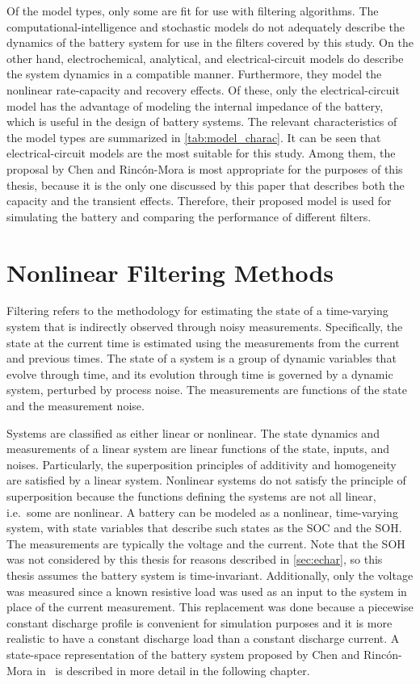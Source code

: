 \documentclass[../zhang_thesis.tex]{subfiles}
\begin{document}
Of the model types, only some are fit for use with filtering algorithms. The computational-intelligence and stochastic models do not adequately describe the dynamics of the battery system for use in the filters covered by this study. On the other hand, electrochemical, analytical, and electrical-circuit models do describe the system dynamics in a compatible manner. Furthermore, they model the nonlinear rate-capacity and recovery effects. Of these, only the electrical-circuit model has the
advantage of modeling the internal impedance of the battery, which is useful in the design of battery systems. The relevant characteristics of the model types are summarized in \cref{tab:model_charac}. It can be seen that electrical-circuit models are the most suitable for this study. Among them, the proposal by Chen and Rinc\'on-Mora is most appropriate for the purposes of this thesis, because it is the only one discussed by this paper that describes both the capacity and the transient
effects. Therefore, their proposed model is used for simulating the battery and comparing the performance of different filters.


\section{Nonlinear Filtering Methods}

Filtering refers to the methodology for estimating the state of a time-varying system that is indirectly observed through noisy measurements. Specifically, the state at the current time is estimated using the measurements from the current and previous times. The state of a system is a group of dynamic variables that evolve through time, and its evolution through time is governed by a dynamic system, perturbed by process noise. The measurements are functions of the state and the
measurement noise.

Systems are classified as either linear or nonlinear. The state dynamics and measurements of a linear system are linear functions of the state, inputs, and noises. Particularly, the superposition principles of additivity and homogeneity are satisfied by a linear system. Nonlinear systems do not satisfy the principle of superposition because the functions defining the systems are not all linear, i.e.\ some are nonlinear. A battery can be modeled as a nonlinear, time-varying system,
with state variables that describe such states as the SOC and the SOH. The measurements are typically the voltage and the current. Note that the SOH was not considered by this thesis for reasons described in \cref{sec:echar}, so this thesis assumes the battery system is time-invariant. Additionally, only the voltage was measured since a known resistive load was used as an input to the system in place of the current measurement. This replacement was done because a piecewise constant discharge profile is convenient for simulation purposes and it is
more realistic to have a constant discharge load than a constant discharge current. A state-space representation of the battery system proposed by Chen and Rinc\'on-Mora in~\cite{chen06} is described in more detail in the following chapter.
\end{document}
